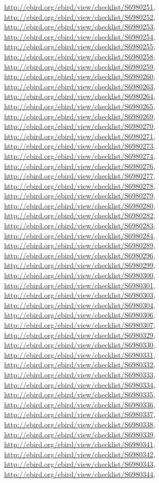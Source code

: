 \documentclass[9pt, article]{memoir}
\begin{document}
\begin{multicols}{2}
\url{http://ebird.org/ebird/view/checklist/S6980251}, 
\url{http://ebird.org/ebird/view/checklist/S6980252}, 
\url{http://ebird.org/ebird/view/checklist/S6980253}, 
\url{http://ebird.org/ebird/view/checklist/S6980254}, 
\url{http://ebird.org/ebird/view/checklist/S6980255}, 
\url{http://ebird.org/ebird/view/checklist/S6980258}, 
\url{http://ebird.org/ebird/view/checklist/S6980259}, 
\url{http://ebird.org/ebird/view/checklist/S6980260}, 
\url{http://ebird.org/ebird/view/checklist/S6980263}, 
\url{http://ebird.org/ebird/view/checklist/S6980264}, 
\url{http://ebird.org/ebird/view/checklist/S6980265}, 
\url{http://ebird.org/ebird/view/checklist/S6980269}, 
\url{http://ebird.org/ebird/view/checklist/S6980270}, 
\url{http://ebird.org/ebird/view/checklist/S6980271}, 
\url{http://ebird.org/ebird/view/checklist/S6980273}, 
\url{http://ebird.org/ebird/view/checklist/S6980274}, 
\url{http://ebird.org/ebird/view/checklist/S6980276}, 
\url{http://ebird.org/ebird/view/checklist/S6980277}, 
\url{http://ebird.org/ebird/view/checklist/S6980278}, 
\url{http://ebird.org/ebird/view/checklist/S6980279}, 
\url{http://ebird.org/ebird/view/checklist/S6980280}, 
\url{http://ebird.org/ebird/view/checklist/S6980282}, 
\url{http://ebird.org/ebird/view/checklist/S6980283}, 
\url{http://ebird.org/ebird/view/checklist/S6980284}, 
\url{http://ebird.org/ebird/view/checklist/S6980289}, 
\url{http://ebird.org/ebird/view/checklist/S6980296}, 
\url{http://ebird.org/ebird/view/checklist/S6980299}, 
\url{http://ebird.org/ebird/view/checklist/S6980300}, 
\url{http://ebird.org/ebird/view/checklist/S6980301}, 
\url{http://ebird.org/ebird/view/checklist/S6980303}, 
\url{http://ebird.org/ebird/view/checklist/S6980304}, 
\url{http://ebird.org/ebird/view/checklist/S6980306}, 
\url{http://ebird.org/ebird/view/checklist/S6980307}, 
\url{http://ebird.org/ebird/view/checklist/S6980329}, 
\url{http://ebird.org/ebird/view/checklist/S6980330}, 
\url{http://ebird.org/ebird/view/checklist/S6980331}, 
\url{http://ebird.org/ebird/view/checklist/S6980332}, 
\url{http://ebird.org/ebird/view/checklist/S6980333}, 
\url{http://ebird.org/ebird/view/checklist/S6980334}, 
\url{http://ebird.org/ebird/view/checklist/S6980335}, 
\url{http://ebird.org/ebird/view/checklist/S6980336}, 
\url{http://ebird.org/ebird/view/checklist/S6980337}, 
\url{http://ebird.org/ebird/view/checklist/S6980338}, 
\url{http://ebird.org/ebird/view/checklist/S6980339}, 
\url{http://ebird.org/ebird/view/checklist/S6980341}, 
\url{http://ebird.org/ebird/view/checklist/S6980342}, 
\url{http://ebird.org/ebird/view/checklist/S6980343}, 
\url{http://ebird.org/ebird/view/checklist/S6980344}, 

\end{multicols}
\end{document}
